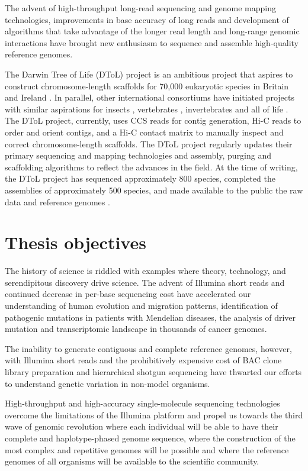 The advent of high-throughput long-read sequencing\cite{} and genome mapping technologies\cite{}, improvements in base accuracy of long reads \cite{Wenger2019-pw} and development of algorithms that take advantage of the longer read length and long-range genomic interactions \cite{Dudchenko2017-kb} have brought new enthusiasm to sequence and assemble high-quality reference genomes\cite {}. 

The Darwin Tree of Life (DToL) project is an ambitious project that aspires to construct chromosome-length scaffolds for 70,000 eukaryotic species in Britain and Ireland \cite{}. In parallel, other international consortiums have initiated projects with similar aspirations for insects \cite{}, vertebrates \cite{}, invertebrates \cite{} and all of life \cite{}. The DToL project, currently, uses CCS reads for contig generation, Hi-C reads to order and orient contigs, and a Hi-C contact matrix to manually inspect and correct chromosome-length scaffolds. The DToL project regularly updates their primary sequencing and mapping technologies and assembly, purging and scaffolding algorithms to reflect the advances in the field. At the time of writing, the DToL project has sequenced approximately 800 species, completed the assemblies of approximately 500 species, and made available to the public the raw data and reference genomes \cite{}. 

\section{Thesis objectives}

The history of science is riddled with examples where theory, technology, and serendipitous discovery drive science. The advent of Illumina short reads and continued decrease in per-base sequencing cost have accelerated our understanding of human evolution and migration patterns\cite{}, identification of pathogenic mutations in patients with Mendelian diseases\cite{}, the analysis of driver mutation and transcriptomic landscape in thousands of cancer genomes\cite{}. 

The inability to generate contiguous and complete reference genomes, however, with Illumina short reads\cite{} and the prohibitively expensive cost of BAC clone library preparation and hierarchical shotgun sequencing have thwarted our efforts to understand genetic variation in non-model organisms\cite{}.

High-throughput and high-accuracy single-molecule sequencing technologies\cite{Wenger2019-pw} overcome the limitations of the Illumina platform and propel us towards the third wave of genomic revolution where each individual will be able to have their complete and haplotype-phased genome sequence, where the construction of the most complex and repetitive genomes will be possible and where the reference genomes of all organisms will be available to the scientific community. 

